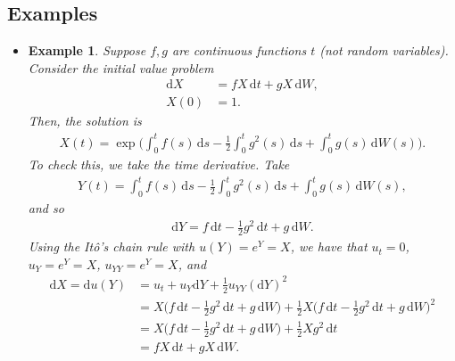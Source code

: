 \documentclass[10pt]{article}
\newtheorem{example}[lemma]{Example}
\newcommand{\dee}{\mathrm{d}}
\begin{document}
\subsection{Examples}

\begin{itemize}
  \item \begin{example}
    Suppose $f,g$ are continuous functions $t$ (not random variables). Consider the initial value problem
    \begin{align*}
      \dee X &= f X \, \dee t + gX\, \dee W, \\
      X(0) &= 1.
    \end{align*}
    Then, the solution is 
    \begin{align*}
      X(t) = \exp\bigg( \int_0^t f(s)\, \dee s -\frac{1}{2}\int_0^t g^2(s)\, \dee s + \int_0^t g(s)\, \dee W(s) \bigg).
    \end{align*}
    To check this, we take the time derivative. Take
    \begin{align*}
      Y(t) = \int_0^t f(s)\, \dee s  -\frac{1}{2}\int_0^t g^2(s)\, \dee s + \int_0^t g(s)\, \dee W(s),
    \end{align*}    
    and so
    \begin{align*}
      \dee Y = f\, \dee t -\frac{1}{2} g^2\, \dee t + g\, \dee W.
    \end{align*}
    Using the It\^{o}'s chain rule with $u(Y) = e^Y = X$, we have that $u_t = 0$, $u_Y = e^Y = X$, $u_{YY} = e^Y = X$, and
    \begin{align*}
      \dee X
      = \dee u(Y)
      &= u_t + u_Y \dee Y + \frac{1}{2} u_{YY} (\dee Y)^2 \\
      &= X \bigg( f\, \dee t -\frac{1}{2} g^2\, \dee t + g\, \dee W \bigg)
      + \frac{1}{2} X \bigg( f\, \dee t -\frac{1}{2} g^2\, \dee t + g\, \dee W \bigg)^2 \\
      &= X \bigg( f\, \dee t -\frac{1}{2} g^2\, \dee t + g\, \dee W \bigg)
      + \frac{1}{2} X g^2\, \dee t \\
      &= f X\,\dee t + gX\, \dee W.
    \end{align*}
  \end{example}


\end{itemize}
\end{document}
